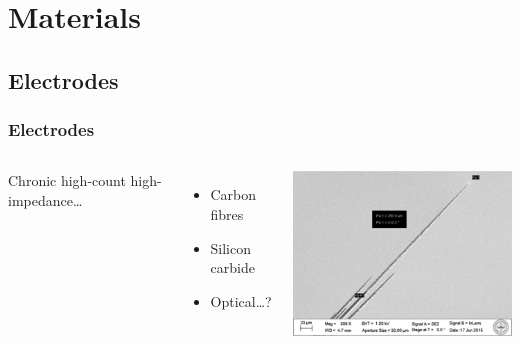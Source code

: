 \documentclass{beamer}
\begin{document}
\section{Materials}
\subsection{Electrodes}

\begin{frame}
  \frametitle{Electrodes}
  \begin{columns}
    \column{4cm}
    Chronic high-count high-impedance\dots
    \begin{itemize}
    \item Carbon fibres
    \item Silicon carbide
    \item Optical\dots?
    \end{itemize}
    \column{7cm}
    \includegraphics[width=\textwidth]{electrodes_up_close}
  \end{columns}
\end{frame}
\end{document}
